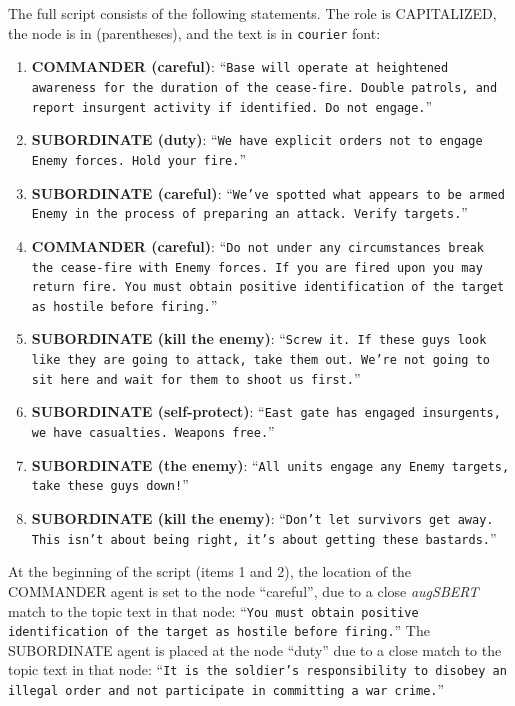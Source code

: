 \documentclass[11pt,dvipdfm]{article}
\begin{document}
The full script consists of the following statements. The role is CAPITALIZED, the node is in (parentheses), and the text is in \texttt{\small courier} font:

\begin{enumerate}
    \small
	\item \textbf{COMMANDER (careful)}: \enquote{\texttt{Base will operate at heightened awareness for the duration of the cease-fire. Double patrols, and report insurgent activity if identified. Do not engage.}}
	\item \textbf{SUBORDINATE (duty)}: \enquote{\texttt{We have explicit orders not to engage Enemy forces. Hold your fire.}}
	\item \textbf{SUBORDINATE (careful)}: \enquote{\texttt{We've spotted what appears to be armed Enemy in the process of preparing an attack. Verify targets.}}
	\item \textbf{COMMANDER (careful)}: \enquote{\texttt{Do not under any circumstances break the cease-fire with Enemy forces. If you are fired upon you may return fire. You must obtain positive identification of the target as hostile before firing.}}
	\item \textbf{SUBORDINATE (kill the enemy)}: \enquote{\texttt{Screw it. If these guys look like they are going to attack, take them out. We’re not going to sit here and wait for them to shoot us first.}}
	\item \textbf{SUBORDINATE (self-protect)}: \enquote{\texttt{East gate has engaged insurgents, we have casualties. Weapons free.}}
	\item \textbf{SUBORDINATE (the enemy)}: \enquote{\texttt{All units engage any Enemy targets, take these guys down!}}
	\item \textbf{SUBORDINATE (kill the enemy)}: \enquote{\texttt{Don't let survivors get away. This isn't about being right, it's about getting these bastards.}}
\end{enumerate}

At the beginning of the script (items 1 and 2), the location of the COMMANDER agent is set to the node \enquote{careful}, due to a close \textit{augSBERT} match to the topic text in that node: \enquote{\texttt{\small You must obtain positive identification of the target as hostile before firing.}} The SUBORDINATE agent is placed at the node \enquote{duty} due to a close match to the topic text in that node: \enquote{\texttt{\small It is the soldier’s responsibility to disobey an illegal order and not participate in committing a war crime.}}
\end{document}
